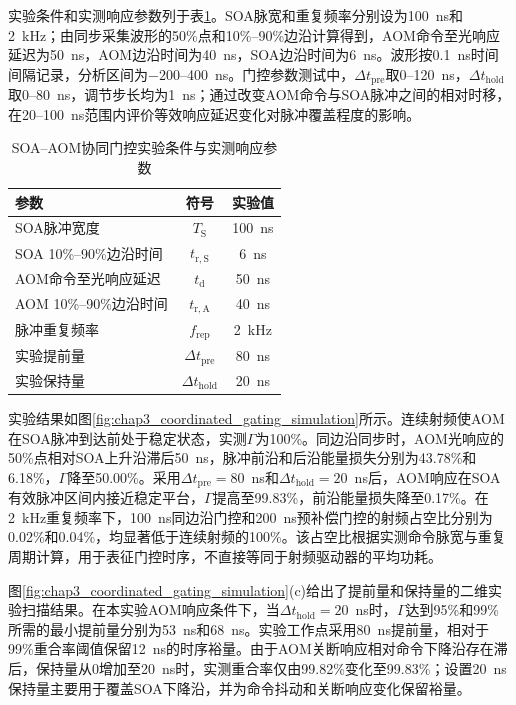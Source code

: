 实验条件和实测响应参数列于表\ref{tab:chap3_gating_simulation_parameters}。SOA脉宽和重复频率分别设为100~ns和2~kHz；由同步采集波形的50\%点和10\%--90\%边沿计算得到，AOM命令至光响应延迟为50~ns，AOM边沿时间为40~ns，SOA边沿时间为6~ns。波形按0.1~ns时间间隔记录，分析区间为$-200$--400~ns。门控参数测试中，$\Delta t_{\mathrm{pre}}$取0--120~ns，$\Delta t_{\mathrm{hold}}$取0--80~ns，调节步长均为1~ns；通过改变AOM命令与SOA脉冲之间的相对时移，在20--100~ns范围内评价等效响应延迟变化对脉冲覆盖程度的影响。

\begin{table}[htbp]
  \centering
  \caption{SOA--AOM协同门控实验条件与实测响应参数}
  \label{tab:chap3_gating_simulation_parameters}
  \begin{tabular}{lcc}
    \toprule
    参数 & 符号 & 实验值 \\
    \midrule
    SOA脉冲宽度 & $T_{\mathrm{S}}$ & 100~ns \\
    SOA 10\%--90\%边沿时间 & $t_{\mathrm{r,S}}$ & 6~ns \\
    AOM命令至光响应延迟 & $t_{\mathrm{d}}$ & 50~ns \\
    AOM 10\%--90\%边沿时间 & $t_{\mathrm{r,A}}$ & 40~ns \\
    脉冲重复频率 & $f_{\mathrm{rep}}$ & 2~kHz \\
    实验提前量 & $\Delta t_{\mathrm{pre}}$ & 80~ns \\
    实验保持量 & $\Delta t_{\mathrm{hold}}$ & 20~ns \\
    \bottomrule
  \end{tabular}
\end{table}

实验结果如图\ref{fig:chap3_coordinated_gating_simulation}所示。连续射频使AOM在SOA脉冲到达前处于稳定状态，实测$\Gamma$为100\%。同边沿同步时，AOM光响应的50\%点相对SOA上升沿滞后50~ns，脉冲前沿和后沿能量损失分别为43.78\%和6.18\%，$\Gamma$降至50.00\%。采用$\Delta t_{\mathrm{pre}}=80$~ns和$\Delta t_{\mathrm{hold}}=20$~ns后，AOM响应在SOA有效脉冲区间内接近稳定平台，$\Gamma$提高至99.83\%，前沿能量损失降至0.17\%。在2~kHz重复频率下，100~ns同边沿门控和200~ns预补偿门控的射频占空比分别为0.02\%和0.04\%，均显著低于连续射频的100\%。该占空比根据实测命令脉宽与重复周期计算，用于表征门控时序，不直接等同于射频驱动器的平均功耗。

图\ref{fig:chap3_coordinated_gating_simulation}(c)给出了提前量和保持量的二维实验扫描结果。在本实验AOM响应条件下，当$\Delta t_{\mathrm{hold}}=20$~ns时，$\Gamma$达到95\%和99\%所需的最小提前量分别为53~ns和68~ns。实验工作点采用80~ns提前量，相对于99\%重合率阈值保留12~ns的时序裕量。由于AOM关断响应相对命令下降沿存在滞后，保持量从0增加至20~ns时，实测重合率仅由99.82\%变化至99.83\%；设置20~ns保持量主要用于覆盖SOA下降沿，并为命令抖动和关断响应变化保留裕量。

